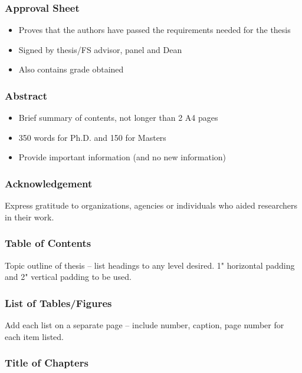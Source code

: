 \documentclass{article}
\begin{document}
\subsubsection{Approval Sheet}

\begin{itemize}
    \item Proves that the authors have passed the requirements needed for the thesis
    \item Signed by thesis/FS advisor, panel and Dean
    \item Also contains grade obtained
\end{itemize}

\subsubsection{Abstract}

\begin{itemize}
    \item Brief summary of contents, not longer than 2 A4 pages
    \item 350 words for Ph.D. and 150 for Masters
    \item Provide important information (and no new information)
\end{itemize}

\subsubsection{Acknowledgement}

Express gratitude to organizations, agencies or individuals who aided researchers in their work.

\subsubsection{Table of Contents}

Topic outline of thesis -- list headings to any level desired. 1" horizontal padding and 2" vertical padding to be used.

\subsubsection{List of Tables/Figures}

Add each list on a separate page -- include number, caption, page number for each item listed.

\subsubsection{Title of Chapters}
\end{document}
